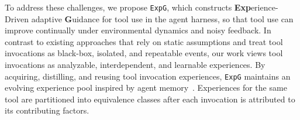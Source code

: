 \documentclass[11pt]{article}
\newcommand{\ours}{\texttt{ExpG}}
\begin{document}
To address these challenges, we propose {\ours}, which constructs \textbf{Exp}erience-Driven adaptive \textbf{G}uidance for tool use in the agent harness, so that tool use can improve continually under environmental dynamics and noisy feedback.
In contrast to existing approaches that rely on static assumptions and treat tool invocations as black-box, isolated, and repeatable events, our work views tool invocations as analyzable, interdependent, and learnable experiences. 
By acquiring, distilling, and reusing tool invocation experiences, {\ours} maintains an evolving experience pool inspired by agent memory~\cite{memsurvey}.
Experiences for the same tool are partitioned into equivalence classes after each invocation is attributed to its contributing factors.
\end{document}
